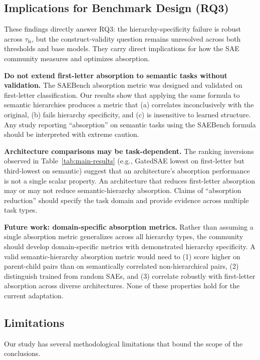 \documentclass{article}
\begin{document}
\subsection{Implications for Benchmark Design (RQ3)}

These findings directly answer RQ3: the hierarchy-specificity failure is robust across $\tau_{\text{fs}}$, but the construct-validity question remains unresolved across both thresholds and base models. They carry direct implications for how the SAE community measures and optimizes absorption.

\textbf{Do not extend first-letter absorption to semantic tasks without validation.} The SAEBench absorption metric was designed and validated on first-letter classification. Our results show that applying the same formula to semantic hierarchies produces a metric that (a) correlates inconclusively with the original, (b) fails hierarchy specificity, and (c) is insensitive to learned structure. Any study reporting ``absorption'' on semantic tasks using the SAEBench formula should be interpreted with extreme caution.

\textbf{Architecture comparisons may be task-dependent.} The ranking inversions observed in Table~\ref{tab:main-results} (e.g., GatedSAE lowest on first-letter but third-lowest on semantic) suggest that an architecture's absorption performance is not a single scalar property. An architecture that reduces first-letter absorption may or may not reduce semantic-hierarchy absorption. Claims of ``absorption reduction'' should specify the task domain and provide evidence across multiple task types.

\textbf{Future work: domain-specific absorption metrics.} Rather than assuming a single absorption metric generalizes across all hierarchy types, the community should develop domain-specific metrics with demonstrated hierarchy specificity. A valid semantic-hierarchy absorption metric would need to (1) score higher on parent-child pairs than on semantically correlated non-hierarchical pairs, (2) distinguish trained from random SAEs, and (3) correlate robustly with first-letter absorption across diverse architectures. None of these properties hold for the current adaptation.

\subsection{Limitations}

Our study has several methodological limitations that bound the scope of the conclusions.
\end{document}
